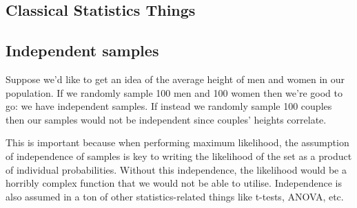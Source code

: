 \documentclass[11pt]{article}
\begin{document}
\begin{appendices}
\section{Classical Statistics Things}

\subsection{Independent samples}
Suppose we'd like to get an idea of the average height of men and women in our population. If we randomly sample 100 men and 100 women then we're good to go: we have independent samples. If instead we randomly sample 100 couples then our samples would not be independent since couples' heights correlate.

This is important because when performing maximum likelihood, the assumption of independence of samples is key to writing the likelihood of the set as a product of individual probabilities. Without this independence, the likelihood would be a horribly complex function that we would not be able to utilise. Independence is also assumed in a ton of other statistics-related things like t-tests, ANOVA, etc.

\end{appendices}
\end{document}
